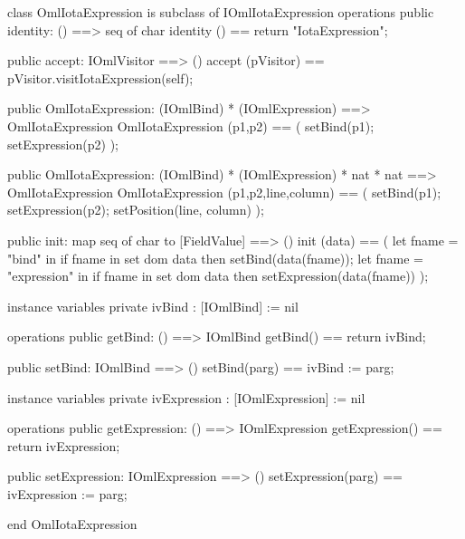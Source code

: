\begin{vdm_al}
class OmlIotaExpression is subclass of IOmlIotaExpression
operations
  public identity: () ==> seq of char
  identity () == return "IotaExpression";

  public accept: IOmlVisitor ==> ()
  accept (pVisitor) == pVisitor.visitIotaExpression(self);

  public OmlIotaExpression:
    (IOmlBind) *
    (IOmlExpression) ==> OmlIotaExpression
  OmlIotaExpression (p1,p2) == 
    ( setBind(p1);
      setExpression(p2) );

  public OmlIotaExpression:
    (IOmlBind) *
    (IOmlExpression) *
    nat *
    nat ==> OmlIotaExpression
  OmlIotaExpression (p1,p2,line,column) == 
    ( setBind(p1);
      setExpression(p2);
      setPosition(line, column) );

  public init: map seq of char to [FieldValue] ==> ()
  init (data) ==
    ( let fname = "bind" in
        if fname in set dom data
        then setBind(data(fname));
      let fname = "expression" in
        if fname in set dom data
        then setExpression(data(fname)) );

instance variables
  private ivBind : [IOmlBind] := nil

operations
  public getBind: () ==> IOmlBind
  getBind() == return ivBind;

  public setBind: IOmlBind ==> ()
  setBind(parg) == ivBind := parg;

instance variables
  private ivExpression : [IOmlExpression] := nil

operations
  public getExpression: () ==> IOmlExpression
  getExpression() == return ivExpression;

  public setExpression: IOmlExpression ==> ()
  setExpression(parg) == ivExpression := parg;

end OmlIotaExpression
\end{vdm_al}

